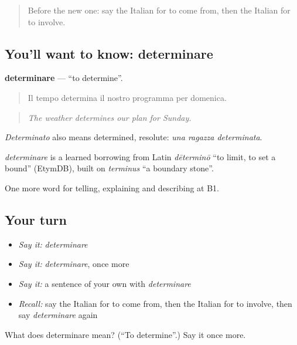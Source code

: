 \begin{quote}
Before the new one: say the Italian for to come from, then the Italian for to involve.
\end{quote}

\subsection*{You'll want to know: determinare}
\textbf{determinare} — \textquotedblleft{}to determine\textquotedblright{}.

\begin{quote}
Il tempo determina il nostro programma per domenica.
\end{quote}

\begin{quote}
\emph{The weather determines our plan for Sunday.}
\end{quote}

\emph{Determinato} also means determined, resolute: \emph{una ragazza determinata}.

\begin{cousinweb}
\emph{determinare} is a learned borrowing from Latin \emph{dēterminō} \textquotedblleft{}to limit, to set a bound\textquotedblright{} (EtymDB), built on \emph{terminus} \textquotedblleft{}a boundary stone\textquotedblright{}.
\end{cousinweb}

\begin{grammarlens}[title={What you've built}]
One more word for telling, explaining and describing at B1.
\end{grammarlens}

\subsection*{Your turn}
\begin{itemize}
\raggedright
  \item \emph{Say it:} \emph{determinare}
  \item \emph{Say it:} \emph{determinare}, once more
  \item \emph{Say it:} a sentence of your own with \emph{determinare}
  \item \emph{Recall:} say the Italian for to come from, then the Italian for to involve, then say \emph{determinare} again
\end{itemize}

\begin{tcolorbox}[breakable,colback=teal!4,colframe=teal!35!black,title={Before you move on}]
What does determinare mean? (\textquotedblleft{}To determine\textquotedblright{}.) Say it once more.
\end{tcolorbox}
